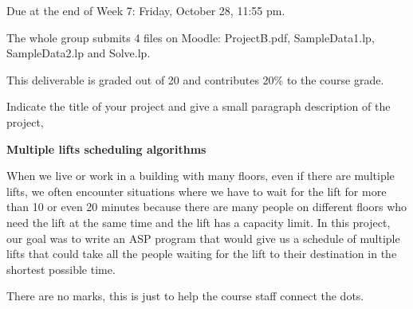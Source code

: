 \documentclass{article}
\begin{document}
Due at the end of Week 7: Friday, October 28, 11:55 pm.

The whole group submits 4 files on Moodle: ProjectB.pdf, SampleData1.lp, SampleData2.lp and Solve.lp.

This deliverable is graded out of 20 and contributes 20\% to the course grade.



\begin{Question}
Indicate the title of your project and give a small paragraph description of the project,
\begin{answer}
\item \textbf{Multiple lifts scheduling algorithms}  
\item When we live or work in a building with many floors, even if there are multiple lifts, we often encounter situations where we have to wait for the lift for more than 10 or even 20 minutes because there are many people on different floors who need the lift at the same time and the lift has a capacity limit. In this project, our goal was to write an ASP program that would give us a schedule of multiple lifts that could take all the people waiting for the lift to their destination in the shortest possible time.
\end{answer}
\begin{markingguide}
 There are no marks, this is just to help the course staff connect the dots.
\end{markingguide}
\end{Question}
\end{document}
